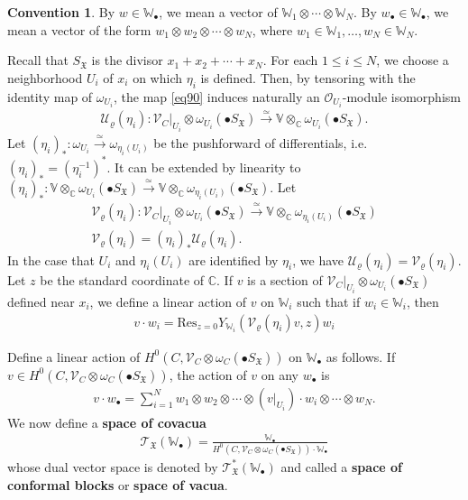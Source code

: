 \documentclass[12pt,a4paper,notitlepage]{report}
\theoremstyle{definition}
\newtheorem{cv}[df]{Convention}
\theoremstyle{plain}
\newcommand{\fk}{\mathfrak}
\newcommand{\mc}{\mathcal}
\newcommand{\Res}{\mathrm{Res}}
\newcommand{\scr}{\mathscr}
\newcommand{\blt}{\bullet}
\newcommand{\Vbb}{\mathbb V}
\newcommand{\Wbb}{\mathbb W}
\newcommand{\Cbb}{\mathbb C}
\numberwithin{equation}{section}
\begin{document}
\begin{cv}
By $w\in\Wbb_\blt$, we mean a vector of $\Wbb_1\otimes\cdots\otimes \Wbb_N$. \index{w@$w_\blt,\Wbb_\blt$} By $w_\blt\in \Wbb_\blt$, we mean a vector of the form $w_1\otimes w_2\otimes\cdots\otimes w_N$, where $w_1\in \Wbb_1,\dots,w_N\in\Wbb_N$.
\end{cv}



Recall that $S_{\fk X}$ is the divisor $x_1+x_2+\cdots+x_N$. For each $1\leq i\leq N$, we choose a neighborhood $U_i$ of $x_i$ on which $\eta_i$ is defined. Then, by tensoring with the identity map of $\omega_{U_i}$,  the map \eqref{eq90} induces naturally an $\scr O_{U_i}$-module isomorphism 
\begin{align*}
\mc U_\varrho(\eta_i):\scr V_C|_{U_i}\otimes\omega_{U_i}(\blt S_{\fk X})\xrightarrow{\simeq}\Vbb\otimes_{\Cbb}\omega_{U_i}(\blt S_{\fk X}).
\end{align*}
Let $(\eta_i)_*:\omega_{U_i}\xrightarrow{\simeq}\omega_{\eta_i(U_i)}$  be the pushforward of differentials, i.e. $(\eta_i)_*=(\eta_i^{-1})^*$. It can be extended by linearity to $(\eta_i)_*:\Vbb\otimes_{\Cbb}\omega_{U_i}(\blt S_{\fk X})\xrightarrow{\simeq}\Vbb\otimes_{\Cbb}\omega_{\eta_i(U_i)}(\blt S_{\fk X})$. Let
\begin{gather}
\mc V_\varrho(\eta_i):\scr V_C|_{U_i}\otimes\omega_{U_i}(\blt S_{\fk X})\xrightarrow{\simeq}\Vbb\otimes_{\Cbb}\omega_{\eta_i(U_i)}(\blt S_{\fk X})\nonumber\\
\mc V_{\varrho}(\eta_i)=(\eta_i)_*\mc U_{\varrho}(\eta_i).\label{eq233}
\end{gather}
In the case that $U_i$ and $\eta_i(U_i)$ are identified by $\eta_i$, we have $\mc U_\varrho(\eta_i)=\mc V_\varrho(\eta_i)$. Let $z$ be the standard coordinate of $\Cbb$. If $v$ is a section of $\scr V_C|_{U_i}\otimes\omega_{U_i}(\blt S_{\fk X})$ defined near $x_i$, we define a linear action of $v$ on $\Wbb_i$ such that if $w_i\in\Wbb_i$, \index{vw@$v\cdot w_i,v\cdot w_\blt$} then
\begin{align}
\boxed{~~v\cdot w_i=\Res_{z=0}Y_{\Wbb_i}(\mc V_\varrho(\eta_i)v,z)w_i~~}\label{eq230}
\end{align}


Define a linear action of $H^0(C,\scr V_C\otimes\omega_C(\blt S_{\fk X}))$ on $\Wbb_\blt$ as follows.  
If $v\in H^0(C,\scr V_C\otimes\omega_C(\blt S_{\fk X}))$, the action of $v$ on any $w_\blt$ is
\begin{align}
v\cdot w_\blt=\sum_{i=1}^N w_1\otimes w_2\otimes\cdots \otimes (v|_{U_i})\cdot w_i \otimes\cdots\otimes w_N.\label{eq231}
\end{align}
We now define a \textbf{space of covacua} 
\begin{gather}
\scr T_{\fk X}(\Wbb_\blt)=\frac{\Wbb_\blt}{H^0(C,\scr V_C\otimes\omega_C(\blt S_{\fk X}))\cdot \Wbb_\blt}
\end{gather}
whose dual vector space is denoted by $\scr T_{\fk X}^*(\Wbb_\blt)$ \index{T@$\scr T_{\fk X}(\Wbb_\blt),\scr T_{\fk X}^*(\Wbb_\blt)$} and called a \textbf{space of conformal blocks} or \textbf{space of vacua}.
\end{document}
